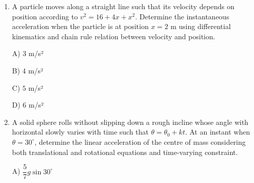 \documentclass[12pt]{article}
\begin{document}
\begin{enumerate}
D) \(\sqrt{\dfrac{g}{L}}\)


\item A particle moves along a straight line such that its velocity depends on position according to \(v^2 = 16 + 4x + x^2\). Determine the instantaneous acceleration when the particle is at position \(x=2\) m using differential kinematics and chain rule relation between velocity and position.

A) \(3\) m/s²  

B) \(4\) m/s²  

C) \(5\) m/s²  

D) \(6\) m/s²  

\item A solid sphere rolls without slipping down a rough incline whose angle with horizontal slowly varies with time such that \(\theta = \theta_0 + kt\). At an instant when \(\theta = 30^\circ\), determine the linear acceleration of the centre of mass considering both translational and rotational equations and time-varying constraint.

\begin{center}
\end{center}

A) \(\dfrac{5}{7}g\sin30^\circ\)  


\end{enumerate}
\end{document}
